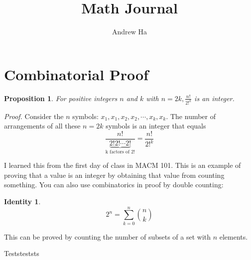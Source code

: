 \documentclass[11pt, oneside]{article}   	%
\title{Math Journal}
\author{Andrew Ha}
\date{}							%
\newtheorem{proposition}{Proposition}
\newtheorem{identity}{Identity}
\begin{document}
\maketitle
\section*{Combinatorial Proof}
\begin{proposition} For positive integers $n$ and $k$ with $n=2k, \frac{n!}{2!^k}$ is an integer. \end{proposition}
\emph{Proof.}  Consider the $n$ symbols: $x_1, x_1, x_2, x_2, \cdots, x_k, x_k$.
The number of arrangements of all these $n = 2k$ symbols is an integer that equals
\[
\frac{n!}{\underbrace{2! 2! \cdots 2!}_{\text{k factors of 2!}}} = \frac{n!}{2!^k}
\]

I learned this from the first day of class in MACM 101. This is an example of proving that a value is an integer by obtaining that value from counting something. You can also use combinatorics in proof by double counting:
\begin{identity} 
\[
2^n = \sum_{k=0}^{n}  \binom{n}{k}
\]
\end{identity}

This can be proved by counting the number of subsets of a set with $n$ elements. 

Teststeststs
\end{document}
